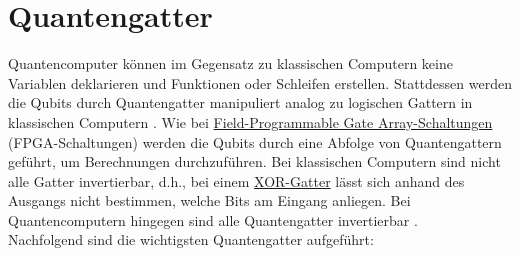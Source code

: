 \section{Quantengatter}
Quantencomputer können im Gegensatz zu klassischen Computern keine Variablen deklarieren und Funktionen oder Schleifen erstellen.
Stattdessen werden die Qubits durch Quantengatter manipuliert analog zu logischen Gattern in klassischen Computern \cite{ct2020quantengatter}.
Wie bei \hyperlink{fpga-def}{Field-Programmable Gate Array-Schaltungen} (FPGA-Schaltungen) werden die Qubits durch eine Abfolge von Quantengattern geführt, um Berechnungen durchzuführen.
Bei klassischen Computern sind nicht alle Gatter invertierbar, d.h., bei einem \hyperlink{xor-gate-def}{XOR-Gatter} lässt sich anhand des Ausgangs nicht bestimmen,
welche Bits am Eingang anliegen. Bei Quantencomputern hingegen sind alle Quantengatter invertierbar \cite{ct2022quantencomputer}.
\\
Nachfolgend sind die wichtigsten Quantengatter aufgeführt:
